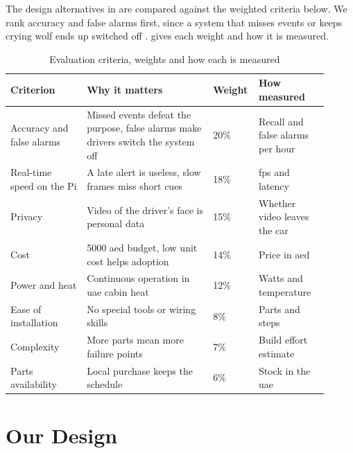 The design alternatives in  are compared against the weighted criteria below.
We rank accuracy and false alarms first, since a system that misses events or keeps crying wolf ends up switched off \cite{r28,r10}.  gives each weight and how it is measured.

\begin{table}[htbp]
\centering
\caption{Evaluation criteria, weights and how each is measured}
\label{tab:ch4-06}
\footnotesize
\setlength{\tabcolsep}{3pt}
\renewcommand{\arraystretch}{1.15}
\begin{tabular}{|p{0.230\linewidth}|p{0.380\linewidth}|p{0.090\linewidth}|p{0.210\linewidth}|}
\hline
\textbf{Criterion} & \textbf{Why it matters} & \textbf{Weight} & \textbf{How measured} \\
\hline
Accuracy and false alarms & Missed events defeat the purpose, false alarms make drivers switch the system off & 20\% & Recall and false alarms per hour \\
\hline
Real-time speed on the Pi & A late alert is useless, slow frames miss short cues & 18\% & \gls{fps} and latency \\
\hline
Privacy & Video of the driver's face is personal data & 15\% & Whether video leaves the car \\
\hline
Cost & 5000 \gls{aed} budget, low unit cost helps adoption & 14\% & Price in \gls{aed} \\
\hline
Power and heat & Continuous operation in \gls{uae} cabin heat & 12\% & Watts and temperature \\
\hline
Ease of installation & No special tools or wiring skills & 8\% & Parts and steps \\
\hline
Complexity & More parts mean more failure points & 7\% & Build effort estimate \\
\hline
Parts availability & Local purchase keeps the schedule & 6\% & Stock in the \gls{uae} \\
\hline
\end{tabular}
\end{table}

\section{Our Design}



